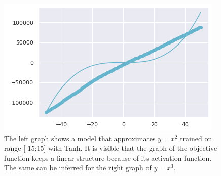 \documentclass{article}
\begin{document}
\begin{figure}[H]
\begin{multicols}{2}
    \includegraphics[width=\linewidth]{Tanhx3.png}\par
\end{multicols}
\caption{The left graph shows a model that approximates $y = x^2$ trained on range [-15;15] with Tanh. It is visible that the graph of the objective function keeps a linear structure because of its activation function. The same can be inferred for the right graph of $y=x^3$.}
\end{figure}
\end{document}

